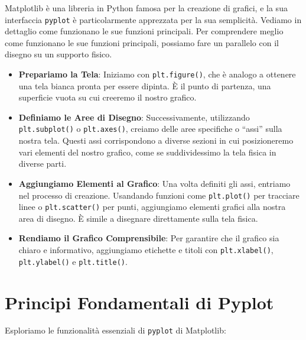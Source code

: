 \documentclass[
  letterpaper,
  krantz2]{{[}./krantz{]}}
\begin{document}
Matplotlib è una libreria in Python famosa per la creazione di grafici,
e la sua interfaccia \texttt{pyplot} è particolarmente apprezzata per la
sua semplicità. Vediamo in dettaglio come funzionano le sue funzioni
principali. Per comprendere meglio come funzionano le sue funzioni
principali, possiamo fare un parallelo con il disegno su un supporto
fisico.

\begin{itemize}
\item
  \textbf{Prepariamo la Tela}: Iniziamo con \texttt{plt.figure()}, che è
  analogo a ottenere una tela bianca pronta per essere dipinta. È il
  punto di partenza, una superficie vuota su cui creeremo il nostro
  grafico.
\item
  \textbf{Definiamo le Aree di Disegno}: Successivamente, utilizzando
  \texttt{plt.subplot()} o \texttt{plt.axes()}, creiamo delle aree
  specifiche o ``assi'' sulla nostra tela. Questi assi corrispondono a
  diverse sezioni in cui posizioneremo vari elementi del nostro grafico,
  come se suddividessimo la tela fisica in diverse parti.
\item
  \textbf{Aggiungiamo Elementi al Grafico}: Una volta definiti gli assi,
  entriamo nel processo di creazione. Usandando funzioni come
  \texttt{plt.plot()} per tracciare linee o \texttt{plt.scatter()} per
  punti, aggiungiamo elementi grafici alla nostra area di disegno. È
  simile a disegnare direttamente sulla tela fisica.
\item
  \textbf{Rendiamo il Grafico Comprensibile}: Per garantire che il
  grafico sia chiaro e informativo, aggiungiamo etichette e titoli con
  \texttt{plt.xlabel()}, \texttt{plt.ylabel()} e \texttt{plt.title()}.
\end{itemize}

\section{Principi Fondamentali di
Pyplot}\label{principi-fondamentali-di-pyplot}

Esploriamo le funzionalità essenziali di \texttt{pyplot} di Matplotlib:
\end{document}
